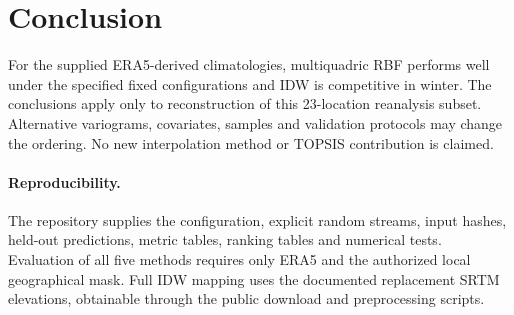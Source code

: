 \documentclass[11pt,a4paper]{article}
\begin{document}
\section{Conclusion}
For the supplied ERA5-derived climatologies, multiquadric RBF performs well under the specified fixed configurations and IDW is competitive in winter. The conclusions apply only to reconstruction of this 23-location reanalysis subset. Alternative variograms, covariates, samples and validation protocols may change the ordering. No new interpolation method or TOPSIS contribution is claimed.

\paragraph{Reproducibility.} The repository supplies the configuration, explicit random streams, input hashes, held-out predictions, metric tables, ranking tables and numerical tests. Evaluation of all five methods requires only ERA5 and the authorized local geographical mask. Full IDW mapping uses the documented replacement SRTM elevations, obtainable through the public download and preprocessing scripts.
\end{document}
